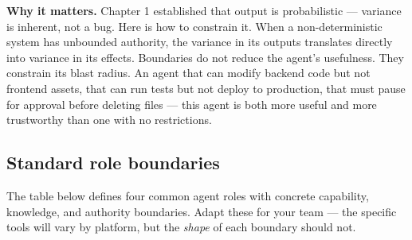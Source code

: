\documentclass[
  a4paper,
  DIV=11,
  numbers=noendperiod]{scrreprt}
\begin{document}
\textbf{Why it matters.} Chapter 1 established that output is
probabilistic --- variance is inherent, not a bug. Here is how to
constrain it. When a non-deterministic system has unbounded authority,
the variance in its outputs translates directly into variance in its
effects. Boundaries do not reduce the agent's usefulness. They constrain
its blast radius. An agent that can modify backend code but not frontend
assets, that can run tests but not deploy to production, that must pause
for approval before deleting files --- this agent is both more useful
and more trustworthy than one with no restrictions.

\subsection{Standard role boundaries}\label{standard-role-boundaries}

The table below defines four common agent roles with concrete
capability, knowledge, and authority boundaries. Adapt these for your
team --- the specific tools will vary by platform, but the \emph{shape}
of each boundary should not.
\end{document}
